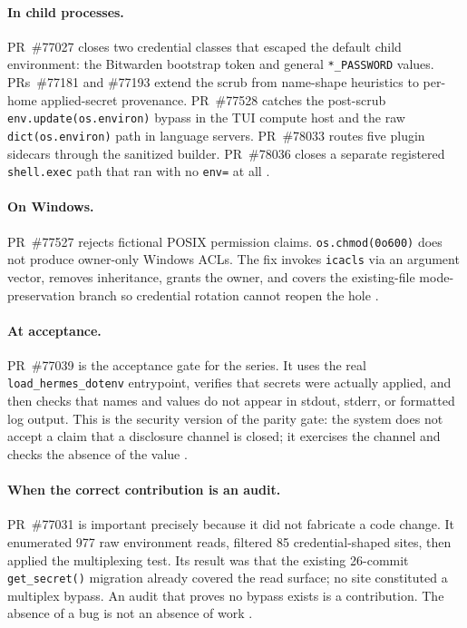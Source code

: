 \documentclass[11pt]{article}
\theoremstyle{definition}
\theoremstyle{plain}
\theoremstyle{remark}
\begin{document}
\paragraph{In child processes.}
PR~\#77027 closes two credential classes that escaped the default child
environment: the Bitwarden bootstrap token and general \texttt{*\_PASSWORD}
values. PRs~\#77181 and \#77193 extend the scrub from name-shape heuristics to
per-home applied-secret provenance. PR~\#77528 catches the post-scrub
\texttt{env.update(os.environ)} bypass in the TUI compute host and the raw
\texttt{dict(os.environ)} path in language servers. PR~\#78033 routes five
plugin sidecars through the sanitized builder. PR~\#78036 closes a separate
registered \texttt{shell.exec} path that ran with no \texttt{env=} at all
\citep{hermespr77027,hermespr77181,hermespr77193,hermespr77528,hermespr78033,hermespr78036}.

\paragraph{On Windows.}
PR~\#77527 rejects fictional POSIX permission claims. \texttt{os.chmod(0o600)}
does not produce owner-only Windows ACLs. The fix invokes \texttt{icacls} via
an argument vector, removes inheritance, grants the owner, and covers the
existing-file mode-preservation branch so credential rotation cannot reopen
the hole \citep{hermespr77527}.

\paragraph{At acceptance.}
PR~\#77039 is the acceptance gate for the series. It uses the real
\texttt{load\_hermes\_dotenv} entrypoint, verifies that secrets were actually
applied, and then checks that names and values do not appear in stdout,
stderr, or formatted log output. This is the security version of the parity
gate: the system does not accept a claim that a disclosure channel is closed;
it exercises the channel and checks the absence of the value
\citep{hermespr77039}.

\paragraph{When the correct contribution is an audit.}
PR~\#77031 is important precisely because it did not fabricate a code change.
It enumerated 977 raw environment reads, filtered 85 credential-shaped sites,
then applied the multiplexing test. Its result was that the existing
26-commit \texttt{get\_secret()} migration already covered the read surface;
no site constituted a multiplex bypass. An audit that proves no bypass exists
is a contribution. The absence of a bug is not an absence of work
\citep{hermespr77031}.
\end{document}
